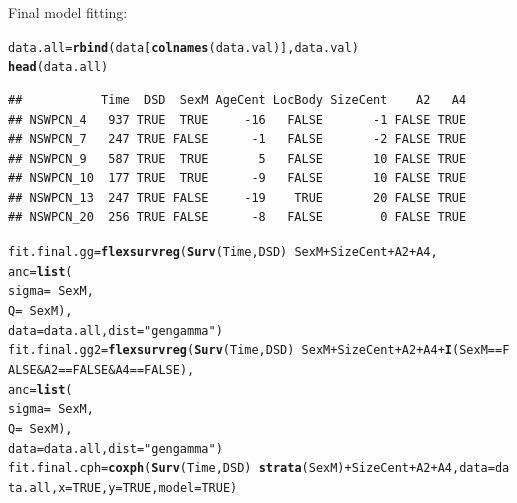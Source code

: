\documentclass{article}\usepackage[]{graphicx}\usepackage[]{color}
\makeatletter
\newcommand{\hlnum}[1]{\textcolor[rgb]{0.686,0.059,0.569}{#1}}%
\newcommand{\hlstr}[1]{\textcolor[rgb]{0.192,0.494,0.8}{#1}}%
\newcommand{\hlopt}[1]{\textcolor[rgb]{0,0,0}{#1}}%
\newcommand{\hlstd}[1]{\textcolor[rgb]{0.345,0.345,0.345}{#1}}%
\newcommand{\hlkwb}[1]{\textcolor[rgb]{0.69,0.353,0.396}{#1}}%
\newcommand{\hlkwc}[1]{\textcolor[rgb]{0.333,0.667,0.333}{#1}}%
\newcommand{\hlkwd}[1]{\textcolor[rgb]{0.737,0.353,0.396}{\textbf{#1}}}%
\newenvironment{kframe}{%
 \def\at@end@of@kframe{}%
 \ifinner\ifhmode%
  \def\at@end@of@kframe{\end{minipage}}%
  \begin{minipage}{\columnwidth}%
 \fi\fi%
 \def\FrameCommand##1{\hskip\@totalleftmargin \hskip-\fboxsep
 \colorbox{shadecolor}{##1}\hskip-\fboxsep
     \hskip-\linewidth \hskip-\@totalleftmargin \hskip\columnwidth}%
 \MakeFramed {\advance\hsize-\width
   \@totalleftmargin\z@ \linewidth\hsize
   \@setminipage}}%
 {\par\unskip\endMakeFramed%
 \at@end@of@kframe}
\newenvironment{knitrout}{}{} %
\makeatother
\begin{document}
Final model fitting:
\begin{knitrout}
\color{fgcolor}\begin{kframe}
\begin{alltt}
\hlstd{data.all} \hlkwb{=} \hlkwd{rbind}\hlstd{(data[}\hlkwd{colnames}\hlstd{(data.val)], data.val)}
\hlkwd{head}\hlstd{(data.all)}
\end{alltt}
\begin{verbatim}
##           Time  DSD  SexM AgeCent LocBody SizeCent    A2   A4
## NSWPCN_4   937 TRUE  TRUE     -16   FALSE       -1 FALSE TRUE
## NSWPCN_7   247 TRUE FALSE      -1   FALSE       -2 FALSE TRUE
## NSWPCN_9   587 TRUE  TRUE       5   FALSE       10 FALSE TRUE
## NSWPCN_10  177 TRUE  TRUE      -9   FALSE       10 FALSE TRUE
## NSWPCN_13  247 TRUE FALSE     -19    TRUE       20 FALSE TRUE
## NSWPCN_20  256 TRUE FALSE      -8   FALSE        0 FALSE TRUE
\end{verbatim}
\begin{alltt}
\hlstd{fit.final.gg} \hlkwb{=} \hlkwd{flexsurvreg}\hlstd{(}\hlkwd{Surv}\hlstd{(Time, DSD)} \hlopt{~} \hlstd{SexM} \hlopt{+} \hlstd{SizeCent} \hlopt{+} \hlstd{A2} \hlopt{+} \hlstd{A4,}
        \hlkwc{anc} \hlstd{=} \hlkwd{list}\hlstd{(}
                \hlkwc{sigma} \hlstd{=} \hlopt{~} \hlstd{SexM,}
                \hlkwc{Q} \hlstd{=} \hlopt{~} \hlstd{SexM),}
        \hlkwc{data} \hlstd{= data.all,} \hlkwc{dist} \hlstd{=} \hlstr{"gengamma"}\hlstd{)}
\hlstd{fit.final.gg2} \hlkwb{=} \hlkwd{flexsurvreg}\hlstd{(}\hlkwd{Surv}\hlstd{(Time, DSD)} \hlopt{~} \hlstd{SexM} \hlopt{+} \hlstd{SizeCent} \hlopt{+} \hlstd{A2} \hlopt{+} \hlstd{A4} \hlopt{+} \hlkwd{I}\hlstd{(SexM} \hlopt{==} \hlnum{FALSE} \hlopt{&} \hlstd{A2} \hlopt{==} \hlnum{FALSE} \hlopt{&} \hlstd{A4} \hlopt{==} \hlnum{FALSE}\hlstd{),}
    \hlkwc{anc} \hlstd{=} \hlkwd{list}\hlstd{(}
        \hlkwc{sigma} \hlstd{=} \hlopt{~} \hlstd{SexM,}
        \hlkwc{Q} \hlstd{=} \hlopt{~} \hlstd{SexM),}
    \hlkwc{data} \hlstd{= data.all,} \hlkwc{dist} \hlstd{=} \hlstr{"gengamma"}\hlstd{)}
\hlstd{fit.final.cph} \hlkwb{=} \hlkwd{coxph}\hlstd{(}\hlkwd{Surv}\hlstd{(Time, DSD)} \hlopt{~} \hlkwd{strata}\hlstd{(SexM)} \hlopt{+} \hlstd{SizeCent} \hlopt{+} \hlstd{A2} \hlopt{+} \hlstd{A4,} \hlkwc{data} \hlstd{= data.all,} \hlkwc{x} \hlstd{=} \hlnum{TRUE}\hlstd{,} \hlkwc{y} \hlstd{=} \hlnum{TRUE}\hlstd{,} \hlkwc{model} \hlstd{=} \hlnum{TRUE}\hlstd{)}

\end{alltt}
\end{kframe}
\end{knitrout}
\end{document}
